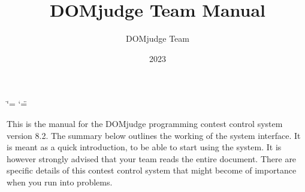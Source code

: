 \documentclass[a4paper,10pt,english,openany]{sphinxmanual}
\title{DOMjudge Team Manual}
\date{2023}
\author{DOMjudge Team}
\begin{document}
\ifdefined\shorthandoff
  \ifnum\catcode`\=\string=\active\shorthandoff{=}\fi
  \ifnum\catcode`\"=\active{}\fi
\fi

\pagestyle{empty}

\pagestyle{plain}

\pagestyle{normal}
\label{\detokenize{team::doc}}



\sphinxAtStartPar
This is the manual for the DOMjudge programming contest control system
version 8.2.
The summary below outlines the working of the system interface. It
is meant as a quick introduction, to be able to start using the system.
It is however strongly advised that your team reads the entire document.
There are specific details of this contest control system that might
become of importance when you run into problems.
\end{document}
